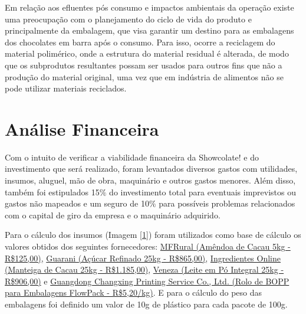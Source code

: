 \documentclass[
	12pt,				%
	openright,			%
	oneside,			%
	a4paper,			%
	english,			%
	french,				%
	spanish,			%
	brazil				%
	]{abntex2}
\begin{document}
Em relação aos efluentes pós consumo e impactos ambientais da operação existe uma preocupação com o planejamento do ciclo de vida do produto e principalmente da embalagem, que visa garantir um destino para as embalagens dos chocolates em barra após o consumo. Para isso, ocorre a reciclagem do material polimérico, onde a estrutura do material residual é alterada, de modo que os subprodutos resultantes possam ser usados para outros fins que não a produção do material original, uma vez que em indústria de alimentos não se pode utilizar materiais reciclados.

\chapter{Análise Financeira}

Com o intuito de verificar a viabilidade financeira da Showcolate! e do investimento que será realizado, foram levantados diversos gastos com utilidades, insumos, aluguel, mão de obra, maquinário e outros gastos menores. Além disso, também foi estipulados 15$\%$ do investimento total para eventuais imprevistos ou gastos não mapeados e um seguro de 10$\%$ para possíveis problemas relacionados com o capital de giro da empresa e o maquinário adquirido.

Para o cálculo dos insumos (Imagem \ref{1}) foram utilizados como base de cálculo os valores obtidos dos seguintes fornecedores: \href{https://www.mfrural.com.br/detalhe/185844/amendoa-do-cacau-inteira}{MFRural (Amêndoa de Cacau 5kg - R\$125,00)}, \href{https://www.aguarani.com.br/acucar-refinado---saco-de-25-kg-36826724}{Guarani (Açúcar Refinado 25kg - R\$865,00)}, \href{https://www.ingredientesonline.com.br/manteiga-de-cacau?utm_source=google&https://www.ingredientesonline.com.br/https://www.ingredientesonline.com.bhttps://www.ingredientesonline.com.br/?utm_source=google&utm_medium=cpc&utm_campaign=geral&utm_term=keywords&utm_content=google_shopping_io_b2c_keywords_brasil_geral_produto_produto_feed_produtos_roas4#volume=5672}{Ingredientes Online (Manteiga de Cacau 25kg - R\$1.185,00)}, \href{https://feijaoveneza.com.br/leite-em-po-integral-25-kg-saco}{Veneza (Leite em Pó Integral 25kg - R\$906,00)} e \href{https://pt.made-in-china.com/co_cx-pack/product_Custom-Print-Automatic-Sachet-Packaging-Roll-Film-Food-Plastic-Laminated-Aluminum-Foil-Bags-Print-Rolls_uoossrhseg.html}{Guangdong Changxing Printing Service Co., Ltd. (Rolo de BOPP para Embalagens FlowPack - R\$5,20/kg)}. E para o cálculo do peso das embalagens foi definido um valor de 10g de plástico para cada pacote de 100g.
\end{document}

